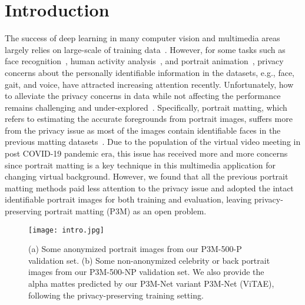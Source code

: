 \documentclass[twocolumn]{svjour3}
\begin{document}
\section{Introduction}

The success of deep learning in many computer vision and multimedia areas largely relies on large-scale of training data~\citep{zhang2020empowering}. However, for some tasks such as face recognition~\citep{masi2018deep}, human activity analysis~\citep{sun2019deep}, and portrait animation~\citep{9229197,Chen_2020_CVPR}, privacy concerns about the personally identifiable information in the datasets, e.g., face, gait, and voice, have attracted increasing attention recently. Unfortunately, how to alleviate the privacy concerns in data while not affecting the performance remains challenging and under-explored~\citep{yang2021study}. Specifically, portrait matting, which refers to estimating the accurate foregrounds from portrait images, suffers more from the privacy issue as most of the images contain identifiable faces in the previous matting datasets~\citep{dim,hatt,dapm}. Due to the population of the virtual video meeting in post COVID-19 pandemic era, this issue has received more and more concerns since portrait matting is a key technique in this multimedia application for changing virtual background. However, we found that all the previous portrait matting methods paid less attention to the privacy issue and adopted the intact identifiable portrait images for both training and evaluation, leaving privacy-preserving portrait matting (P3M) as an open problem.

\begin{figure}[t]
    \centering
    \texttt{[image: intro.jpg]}
    \caption{(a) Some anonymized portrait images from our P3M-500-P validation set. (b) Some non-anonymized celebrity or back portrait images from our P3M-500-NP validation set. We also provide the alpha mattes predicted by our P3M-Net variant P3M-Net (ViTAE), following the privacy-preserving training setting.}
    \label{fig:introduction}
\end{figure}
\end{document}
